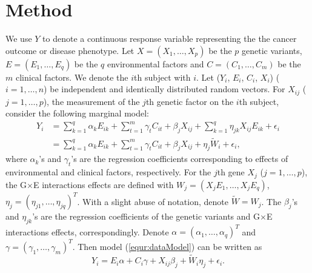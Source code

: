 \documentclass[12pt]{article}
\begin{document}
\section{Method}

We use $Y$ to denote a continuous response variable representing the the cancer outcome or disease phenotype. Let $X=(X_{1},\ldots,X_{p})$ be the $p$ genetic variants, $E=(E_{1},\ldots,E_{q})$ be the $q$ environmental factors and $C=(C_{1},\ldots,C_{m})$ be the $m$ clinical factors. We denote the $i$th subject with $i$. Let ($Y_{i}$, $E_{i}$, $C_{i}$, $X_{i}$) ($i = 1,\ldots,n$) be independent and identically distributed random vectors. For $X_{ij}$ ($j = 1,\ldots,p$), the measurement of the $j$th genetic factor on the $i$th subject,  consider the following marginal model:
\begin{equation}\label{equr:dataModel}
\begin{split}
Y_{i}&=\sum_{k=1}^{q}\alpha_{k}E_{ik}+\sum_{t=1}^{m}\gamma_{t}C_{it}+\beta_{j}X_{ij}+\sum_{k=1}^{q}\eta_{jk}X_{ij}E_{ik}+\epsilon_{i}\\
&=\sum_{k=1}^{q}\alpha_{k}E_{ik}+\sum_{t=1}^{m}\gamma_{t}C_{it}+\beta_{j}X_{ij}+\eta_{j}\tilde{W}_{i}+\epsilon_{i},
\end{split}
\end{equation}
where $\alpha_{k}$'s and $\gamma_{t}$'s are the regression coefficients corresponding to effects of environmental and clinical factors, respectively. For the $j$th gene $X_{j}$ ($j = 1,\ldots,p$), the G$\times$E interactions effects are defined with $W_{j} = (X_{j}E_{1},\ldots,X_{j}E_{q})$, $\eta_{j} = (\eta_{j1}, \ldots, \eta_{jq})^{T}$. With a slight abuse of notation, denote $\tilde{W} = W_{j}$. The $\beta_{j}$'s and $\eta_{jk}$'s are the regression coefficients of the genetic variants and G$\times$E interactions effects, correspondingly.  Denote $\alpha=(\alpha_{1}, \ldots, \alpha_{q})^{T}$ and $\gamma=(\gamma_{1}, \ldots, \gamma_{m})^{T}$. %
Then model (\ref{equr:dataModel}) can be written as 
\begin{equation}
Y_{i} = E_{i}\alpha + C_{i}\gamma + X_{ij}\beta_{j} + \tilde{W}_{i}\eta_{j} + \epsilon_{i}.
\end{equation}
\end{document}
